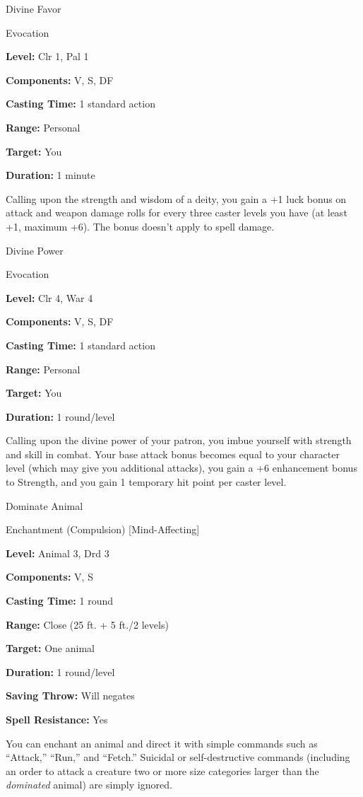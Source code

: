 \documentclass{article}
\begin{document}
\vspace{12pt}
Divine Favor

Evocation

\textbf{Level:} Clr 1, Pal 1

\textbf{Components:} V, S, DF

\textbf{Casting Time:} 1 standard action

\textbf{Range:} Personal

\textbf{Target:} You

\textbf{Duration:} 1 minute

Calling upon the strength and wisdom of a deity, you gain a +1 luck bonus on attack 
and weapon damage rolls for every three caster levels you have (at least +1, maximum 
+6). The bonus doesn't apply to spell damage.

\vspace{12pt}
Divine Power

Evocation

\textbf{Level:} Clr 4, War 4

\textbf{Components:} V, S, DF

\textbf{Casting Time:} 1 standard action

\textbf{Range:} Personal

\textbf{Target:} You

\textbf{Duration:} 1 round/level

Calling upon the divine power of your patron, you imbue yourself with strength 
and skill in combat. Your base attack bonus becomes equal to your character level 
(which may give you additional attacks), you gain a +6 enhancement bonus to Strength, 
and you gain 1 temporary hit point per caster level.

\vspace{12pt}
Dominate Animal

Enchantment (Compulsion) [Mind-Affecting]

\textbf{Level:} Animal 3, Drd 3

\textbf{Components:} V, S

\textbf{Casting Time:} 1 round

\textbf{Range:} Close (25 ft. + 5 ft./2 levels)

\textbf{Target:} One animal

\textbf{Duration:} 1 round/level

\textbf{Saving Throw: }Will negates

\textbf{Spell Resistance:} Yes

You can enchant an animal and direct it with simple commands such as ``Attack,'' 
``Run,'' and ``Fetch.'' Suicidal or self-destructive commands (including an order 
to attack a creature two or more size categories larger than the \textit{dominated 
}animal) are simply ignored.
\end{document}
